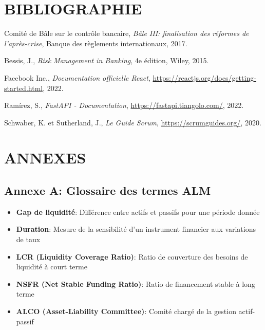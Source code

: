 \documentclass[12pt,a4paper]{report}
\begin{document}
\chapter*{BIBLIOGRAPHIE}

\begin{thebibliography}{9}

Comité de Bâle sur le contrôle bancaire, 
\textit{Bâle III: finalisation des réformes de l'après-crise}, 
Banque des règlements internationaux, 
2017.

Bessis, J., 
\textit{Risk Management in Banking}, 
4e édition, Wiley, 
2015.

Facebook Inc., 
\textit{Documentation officielle React}, 
\url{https://reactjs.org/docs/getting-started.html}, 
2022.

Ramírez, S., 
\textit{FastAPI - Documentation}, 
\url{https://fastapi.tiangolo.com/}, 
2022.

Schwaber, K. et Sutherland, J., 
\textit{Le Guide Scrum}, 
\url{https://scrumguides.org/}, 
2020.

\end{thebibliography}

\chapter*{ANNEXES}

\section*{Annexe A: Glossaire des termes ALM}
\begin{itemize}
    \item \textbf{Gap de liquidité}: Différence entre actifs et passifs pour une période donnée
    \item \textbf{Duration}: Mesure de la sensibilité d'un instrument financier aux variations de taux
    \item \textbf{LCR (Liquidity Coverage Ratio)}: Ratio de couverture des besoins de liquidité à court terme
    \item \textbf{NSFR (Net Stable Funding Ratio)}: Ratio de financement stable à long terme
    \item \textbf{ALCO (Asset-Liability Committee)}: Comité chargé de la gestion actif-passif
\end{itemize}
\end{document}
